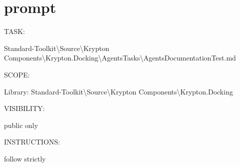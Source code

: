 \chapter{prompt }
\hypertarget{md__d_1_2_krypton-_reference-_repo_2_standard-_toolkit_2_source_2_krypton_01_components_2_krypto48495c31ba63e5406cbff13566d76eac}{}\label{md__d_1_2_krypton-_reference-_repo_2_standard-_toolkit_2_source_2_krypton_01_components_2_krypto48495c31ba63e5406cbff13566d76eac}
TASK\+:
\begin{DoxyItemize}
\item Standard-\/\+Toolkit\textbackslash{}\+Source\textbackslash{}\+Krypton Components\textbackslash{}\+Krypton.\+Docking\textbackslash{}\+Agents\+Tasks\textbackslash{}\+Agents\+Documentation\+Test.md
\end{DoxyItemize}

SCOPE\+:
\begin{DoxyItemize}
\item Library\+: Standard-\/\+Toolkit\textbackslash{}\+Source\textbackslash{}\+Krypton Components\textbackslash{}\+Krypton.\+Docking
\end{DoxyItemize}

VISIBILITY\+:
\begin{DoxyItemize}
\item public only
\end{DoxyItemize}

INSTRUCTIONS\+:
\begin{DoxyItemize}
\item follow  strictly 
\end{DoxyItemize}